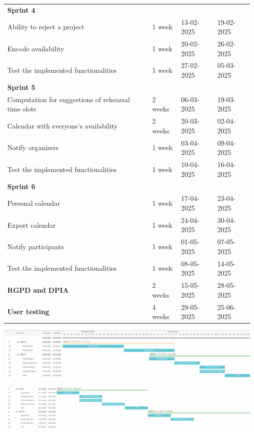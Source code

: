 \documentclass[11pt]{article}
\begin{document}
\begin{table}[htbp]
\begin{tabular}{| p{9cm} | p{2cm} | p{2.1cm} | p{2cm} |}
    \textbf{Sprint 4} &&&\\
    \quad Ability to reject a project & 1 week & 13-02-2025 & 19-02-2025 \\
    \quad Encode availability & 1 week & 20-02-2025 & 26-02-2025 \\
    \quad Test the implemented functionalities & 1 week & 27-02-2025 & 05-03-2025\\
    \textbf{Sprint 5} &&&\\
    \quad Computation for suggestions of rehearsal time slots & 2 weeks & 06-03-2025 & 19-03-2025 \\
    \quad Calendar with everyone's availability & 2 weeks & 20-03-2025 & 02-04-2025 \\
    \quad Notify organizers & 1 week & 03-04-2025 & 09-04-2025 \\
    \quad Test the implemented functionalities & 1 week & 10-04-2025 & 16-04-2025\\
    \textbf{Sprint 6} &&&\\
    \quad Personal calendar & 1 week & 17-04-2025 & 23-04-2025 \\
    \quad Export calendar & 1 week & 24-04-2025 & 30-04-2025 \\
    \quad Notify participants & 1 week & 01-05-2025 & 07-05-2025 \\
    \quad Test the implemented functionalities & 1 week & 08-05-2025 & 14-05-2025\\
    \textbf{RGPD and DPIA} & 2 weeks & 15-05-2025 & 28-05-2025 \\
    \textbf{User testing} & 4 weeks & 29-05-2025 & 25-06-2025\\
    \hline
    \end{tabular}
\end{table}

\newpage

\vspace{1cm}
\hspace{-1.5cm}
\includegraphics[scale=0.6]{g1.png}

\vspace{1cm}
\hspace{-1.5cm}
\includegraphics[scale=0.57]{g2.png} 
\end{document}
